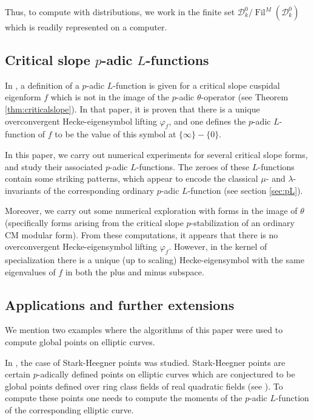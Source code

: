 \documentclass{amsart}
\theoremstyle{plain}
\theoremstyle{definition}
\newcommand{\D}{{\mathcal D}}
\newcommand{\Dk}{\D_{k}}
\DeclareMathOperator{\Fil}{Fil}
\begin{document}
Thus, to compute with distributions, we work in the finite set $\Dk^0/\Fil^M(\Dk^0)$ which is readily represented on a computer.

\subsection{Critical slope $p$-adic $L$-functions}

In \cite{PS}, a definition of a $p$-adic $L$-function is given for a critical slope cuspidal eigenform $f$ which is not in the image of the $p$-adic $\theta$-operator (see Theorem \ref{thm:criticalslope}).  In that paper, it is proven that there is a unique overconvergent Hecke-eigensymbol lifting $\varphi_f$, and one defines the $p$-adic $L$-function of $f$ to be the value of this symbol at $\{\infty\} - \{0\}$.

In this paper, we carry out numerical experiments for several critical slope forms, and study their associated $p$-adic $L$-functions. The zeroes of these $L$-functions contain some striking patterns, which appear to encode the classical $\mu$- and $\lambda$-invariants of the corresponding ordinary $p$-adic $L$-function (see section \ref{sec:pL}).

Moreover, we carry out some numerical exploration with forms in the image of $\theta$ (specifically forms arising from the critical slope $p$-stabilization of an ordinary CM modular form).  From these computations, it appears that there is no overconvergent Hecke-eigensymbol lifting $\varphi_f$.  However, in the kernel of specialization there is a unique (up to scaling) Hecke-eigensymbol with the same eigenvalues of $f$ in both the plus and minus subspace.

\subsection{Applications and further extensions}

We mention two examples where the algorithms of this paper were used to compute global points on elliptic curves.  

In \cite{DP}, the case of Stark-Heegner points was studied.  Stark-Heegner points are certain $p$-adically defined points on elliptic curves which are conjectured to be global points defined over ring class fields of real quadratic fields (see \cite{D}).  To compute these points one needs to compute the moments of the $p$-adic $L$-function of the corresponding elliptic curve.
\end{document}
